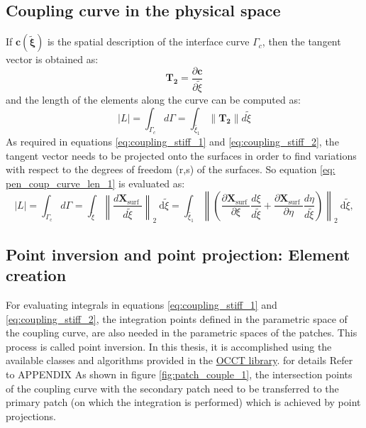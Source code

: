 \documentclass[12pt, a4paper]{report}
\begin{document}
\subsection{Coupling curve in the physical space}
If $\mathbf{c(\tilde{\xi})}$ is the spatial description of the interface curve $\Gamma_c$, then the tangent vector is obtained as:
\begin{equation}
    \mathbf{T_2}=\frac{\partial \mathbf{c}}{\partial \tilde{\xi}}
\end{equation}
and the length of the elements along the curve can be computed as:
\begin{equation}\label{eq: pen_coup_curve_len_1}
    |L|=\int_{\Gamma_{c}} d\Gamma = \int_{\tilde{\xi_1}} \|\mathbf{T_2}\|d\tilde{\xi}
\end{equation}
As required in equations \ref{eq:coupling_stiff_1} and \ref{eq:coupling_stiff_2}, the tangent vector needs to be projected onto the surfaces in order to find variations with respect to the degrees of freedom (r,s) of the surfaces. So equation \ref{eq: pen_coup_curve_len_1} is evaluated as:
\begin{equation}
|L|=\int_{\Gamma_{\mathrm{c}}} d \Gamma_{\mathrm{}}=\int_{\tilde{\xi}}\left\|\frac{d \mathbf{X}_{\text {surf }}}{d \tilde{\xi}}\right\|_2 \mathrm{~d} \tilde{\xi}=\int_{\tilde{\xi_1}}\left\|\left(\frac{\partial \mathbf{X}_{\text {surf }}}{\partial \xi} \frac{d \xi}{d \tilde{\xi}}+\frac{\partial \mathbf{X}_{\text {surf }}}{\partial \eta} \frac{d \eta}{d \tilde{\xi}}\right)\right\|_2 \mathrm{~d} \tilde{\xi},
\end{equation}
\subsection{Point inversion and point projection: Element creation}
For evaluating integrals in equations \ref{eq:coupling_stiff_1} and \ref{eq:coupling_stiff_2}, the integration points defined in the parametric space of the coupling curve, are also needed in the parametric spaces of the patches. This process is called point inversion. In this thesis, it is accomplished using the available classes and algorithms provided in the \href{https://dev.opencascade.org/doc/refman/html/files.html}{OCCT library}. {for details  Refer to APPENDIX} As shown in figure \ref{fig:patch_couple_1}, the intersection points of the coupling curve with the secondary patch need to be transferred to the primary patch (on which the integration is performed) which is achieved by point projections. 
\end{document}
